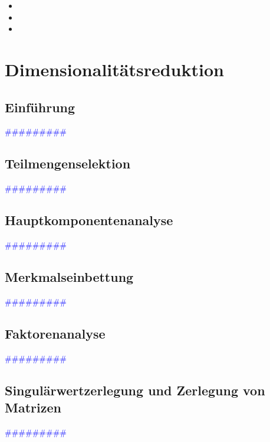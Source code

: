 \documentclass{article}
\begin{document}
      \begin{itemize}
      \color{ForestGreen}
        \item 
        \item
        \item
      \end{itemize}



\newpage
\section{Dimensionalitätsreduktion} %
  \subsection{Einführung} %
      \textcolor{blue}{\#\#\#\#\#\#\#\#\#}
  \subsection{Teilmengenselektion} %
      \textcolor{blue}{\#\#\#\#\#\#\#\#\#}
  \subsection{Hauptkomponentenanalyse} %
      \textcolor{blue}{\#\#\#\#\#\#\#\#\#}
  \subsection{Merkmalseinbettung} %
      \textcolor{blue}{\#\#\#\#\#\#\#\#\#}
  \subsection{Faktorenanalyse} %
      \textcolor{blue}{\#\#\#\#\#\#\#\#\#}
  \subsection{Singulärwertzerlegung und Zerlegung von Matrizen} %
      \textcolor{blue}{\#\#\#\#\#\#\#\#\#}
\end{document}

